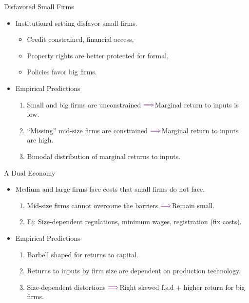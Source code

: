 \documentclass[usenames,dvipsnames,aspectratio=169]{beamer}
\newcommand{\thus}{$\textcolor{violet}{\Longrightarrow}$}
\begin{document}
\begin{frame}{Disfavored Small Firms}
    \begin{itemize}[label=\textcolor{violet}{$\blacktriangleright$}]
        \item Institutional setting disfavor small firms. 
        \begin{itemize}[label=\textcolor{violet}{\small{$\blacktriangleright$}}]
            \item Credit constrained, financial access,
            \item Property rights are better protected for formal, 
            \item Policies favor big firms. 
        \end{itemize}
        \vfill
        \item Empirical Predictions
        \begin{enumerate}[label=\textbf{\textcolor{violet}{\arabic*.}}]
            \item Small and big firms are unconstrained \thus Marginal return to inputs is low. 
            \item ``Missing'' mid-size firms are constrained \thus Marginal return to inputs are high. 
            \item Bimodal distribution of marginal returns to inputs. 
        \end{enumerate}
    \end{itemize}
\end{frame}

\begin{frame}{A Dual Economy}
    \begin{itemize}[label=\textcolor{violet}{$\blacktriangleright$}]
        \item Medium and large firms face costs that small firms do not face. 
        \begin{enumerate}[label=\textbf{\textcolor{violet}{\arabic*.}}]
            \item Mid-size firms cannot overcome the barriers \thus Remain small. 
            \item Ej: Size-dependent regulations, minimum wages, registration (fix costs). 
        \end{enumerate}
        \vfill
        \item Empirical Predictions
        \begin{enumerate}[label=\textbf{\textcolor{violet}{\arabic*.}}]
            \item Barbell shaped for returns to capital. 
            \item Returns to inputs by firm size are dependent on production technology. 
            \item Size-dependent distortions \thus Right skewed f.s.d + higher return for big firms. 
        \end{enumerate}
    \end{itemize}
\end{frame}
\end{document}
